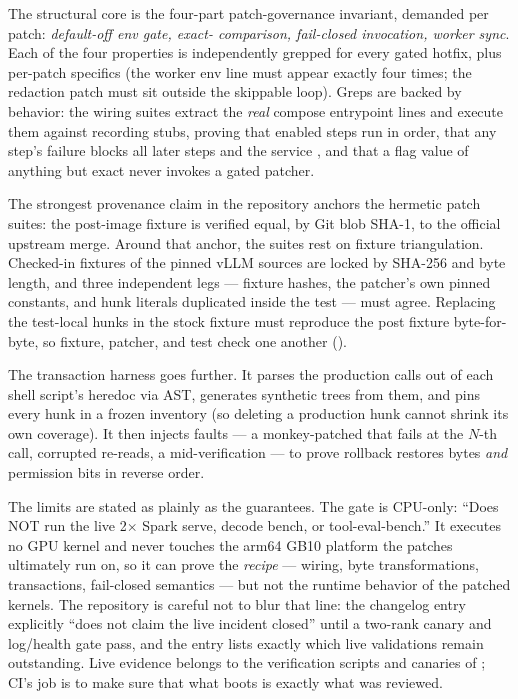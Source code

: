The structural core is the four-part patch-governance invariant, demanded per
patch: \emph{default-off env gate, exact- comparison,
 fail-closed invocation, worker  sync}. Each of
the four properties is independently grepped for every gated hotfix, plus
per-patch specifics (the  worker env line must appear
exactly four times; the redaction patch must sit outside the skippable loop).
Greps are backed by behavior: the wiring suites extract the \emph{real}
compose entrypoint lines and execute them against recording 
stubs, proving that enabled steps run in order, that any step's failure
blocks all later steps and the service , and that a flag value of
anything but exact  never invokes a gated patcher.

The strongest provenance claim in the repository anchors the hermetic patch
suites: the  post-image fixture is verified equal, by Git
blob SHA-1, to the official upstream merge. Around that anchor, the suites
rest on fixture triangulation. Checked-in fixtures of the pinned vLLM
sources are locked by SHA-256 and byte length, and three independent legs
--- fixture hashes, the patcher's own pinned constants, and hunk literals
duplicated inside the test --- must agree. Replacing the test-local hunks in
the stock fixture must reproduce the post fixture byte-for-byte, so fixture,
patcher, and test check one another
().

The transaction harness goes further. It parses the production 
calls out of each shell script's heredoc via AST, generates synthetic trees
from them, and pins every hunk in a frozen inventory (so deleting a production
hunk cannot shrink its own coverage). It then injects faults --- a
monkey-patched  that fails at the $N$-th call, corrupted
re-reads, a  mid-verification --- to prove rollback
restores bytes \emph{and} permission bits in reverse order.

The limits are stated as plainly as the guarantees. The gate is CPU-only:
``Does NOT run the live 2$\times$ Spark serve, decode bench, or
tool-eval-bench.'' It executes no GPU kernel and never touches the arm64
GB10 platform the patches ultimately run on, so it can prove the \emph{recipe}
--- wiring, byte transformations, transactions, fail-closed semantics ---
but not the runtime behavior of the patched kernels. The repository is careful not
to blur that line: the  changelog entry explicitly ``does not
claim the live incident closed'' until a two-rank canary and log/health gate
pass, and the  entry lists exactly which live validations remain
outstanding. Live evidence belongs to the verification scripts and canaries
of ; CI's job is to make sure that what boots is exactly
what was reviewed.

